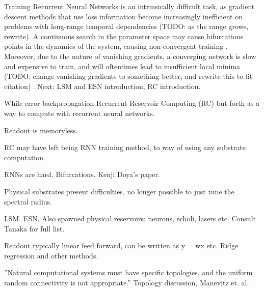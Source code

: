 Training Recurrent Neural Networks is an intrinsically difficult task, as gradient descent methods that use loss information become increasingly inefficient on problems with long-range temporal dependencies (TODO: as the range grows, rewrite).  A continuous search in the parameter space may cause bifurcations points in the dynamics of the system, causing non-convergent training \cite{doya_bifurcations_nodate}. Moreover, due to the nature of vanishing gradients, a converging network is slow and expensive to train, and will oftentimes lead to insufficient local minima (TODO: change vanishing gradients to something better, and rewrite this to fit citation) \cite{bengio_learning_1994}. Next: LSM and ESN introduction, RC introduction.

While error backpropagation Recurrent Reservoir Computing (RC) but forth as a way to compute with recurrent neural networks.

Readout is memoryless.

RC may have left being RNN training method, to way of using any substrate computation.

RNNs are hard. Bifurcations. Kenji Doya's paper.

Physical substrates present difficulties, no longer possible to just tune the spectral radius.

LSM. ESN. Also spawned physical reservoirs: neurons, echoli, lasers etc. Consult Tanaka for full list.

Readout typically linear feed forward, can be written as y = wx etc. Ridge regression and other methods.

''Natural computational systems must have specific topologies, and the uniform random connectivity is not appropriate.'' Topology discussion, Manevitz et. al.

